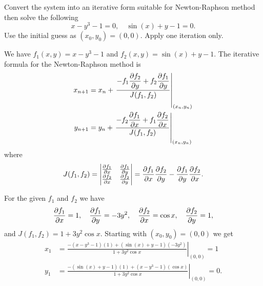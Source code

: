 \documentclass[11pt]{penrose}
\begin{document}
\begin{problem}{6}
    Convert the system into an iterative form suitable for Newton-Raphson method then solve the following
    \begin{equation*}
        x - y^3 - 1 = 0,
        \quad
        \sin(x) + y - 1 = 0.
    \end{equation*}
    Use the initial guess as $(x_0, y_0) = (0,0)$. Apply one iteration only.

    \solution We have $f_1 (x,y) = x - y^3 - 1$ and $f_2 (x,y) = \sin(x) + y - 1$. The iterative formula for the Newton-Raphson method is
    \begin{align*}
        x_{n+1} &= x_{n} + \left.\frac{\displaystyle -f_1 \frac{\partial f_2}{\partial y} + f_2 \frac{\partial f_1}{\partial y}}{J( f_1, f_2 )}\right|_{(x_n, y_n)}\\
        y_{n+1} &= y_{n} + \left.\frac{\displaystyle -f_2 \frac{\partial f_1}{\partial x} + f_1 \frac{\partial f_2}{\partial x}}{J( f_1, f_2 )}\right|_{(x_n, y_n)}
    \end{align*}
    where
    \begin{equation}
        J(f_1, f_2)
        = \begin{vmatrix}
        \frac{\partial f_1}{\partial x} & \frac{\partial f_1}{\partial y}\\
        \frac{\partial f_2}{\partial x} & \frac{\partial f_2}{\partial y}
        \end{vmatrix}
        = \frac{\partial f_1}{\partial x} \frac{\partial f_2}{\partial y} - \frac{\partial f_1}{\partial y} \frac{\partial f_2}{\partial x}.
    \end{equation}

    For the given $f_1$ and $f_2$ we have
    \begin{equation}
        \frac{\partial f_1}{\partial x} = 1, \quad
        \frac{\partial f_1}{\partial y} = -3y^2, \quad
        \frac{\partial f_2}{\partial x} = \cos x, \quad
        \frac{\partial f_2}{\partial y} = 1,
    \end{equation}
    and $J(f_1, f_2) = 1 + 3y^2 \cos x$. Starting with $(x_0, y_0) = (0,0)$ we get
    \begin{align*}
        x_{1} &= \left.\frac{\displaystyle -(x - y^3 - 1)(1) + (\sin(x) + y - 1)(-3y^2)}{1 + 3y^2 \cos x}\right|_{(0,0)} = 1\\
        y_{1} &= \left.\frac{\displaystyle -(\sin(x) + y - 1)(1) + (x - y^3 - 1)(\cos x)}{1 + 3y^2 \cos x}\right|_{(0,0)} = 0.
    \end{align*}
\end{problem}
\end{document}

